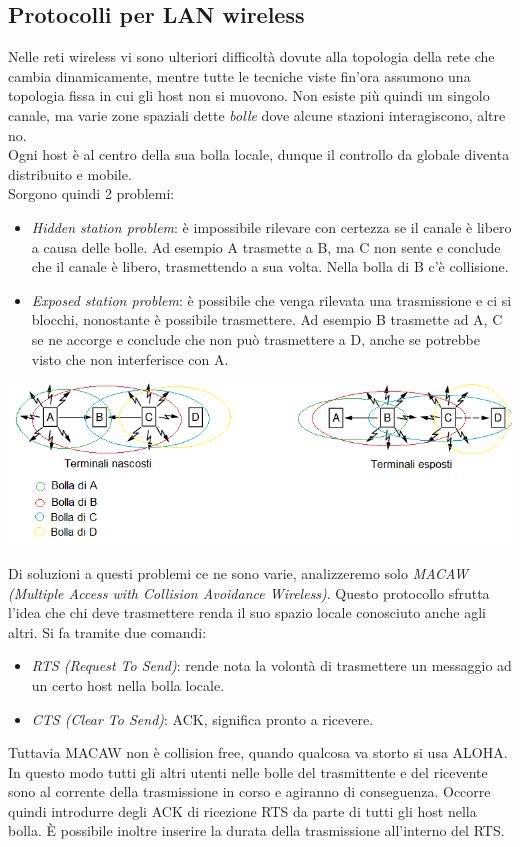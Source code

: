 \documentclass[10pt,a4paper,twoside]{article}
\begin{document}
\subsection{Protocolli per LAN wireless}
Nelle reti wireless vi sono ulteriori difficoltà dovute alla topologia della rete che cambia dinamicamente, mentre tutte le tecniche viste fin'ora assumono una topologia fissa in cui gli host non si muovono. Non esiste più quindi un singolo canale, ma varie zone spaziali dette \textit{bolle} dove alcune stazioni interagiscono, altre no.\\
Ogni host è al centro della sua bolla locale, dunque il controllo da globale diventa distribuito e mobile.\\
Sorgono quindi 2 problemi:
\begin{itemize}
\item \textit{Hidden station problem}: è impossibile rilevare con certezza se il canale è libero a causa delle bolle. Ad esempio A trasmette a B, ma C non sente e conclude che il canale è libero, trasmettendo a sua volta. Nella bolla di B c'è collisione.
\item \textit{Exposed station problem}: è possibile che venga rilevata una trasmissione e ci si blocchi, nonostante è possibile trasmettere. Ad esempio B trasmette ad A, C se ne accorge e conclude che non può trasmettere a D, anche se potrebbe visto che non interferisce con A.
\end{itemize}
\begin{center}
\includegraphics[]{images/problemi_wireless.png}
\end{center}
Di soluzioni a questi problemi ce ne sono varie, analizzeremo solo \textit{MACAW (Multiple Access with Collision Avoidance Wireless)}.
Questo protocollo sfrutta l'idea che chi deve trasmettere renda il suo spazio locale conosciuto anche agli altri. Si fa tramite due comandi:
\begin{itemize}
\item \textit{RTS (Request To Send)}: rende nota la volontà di trasmettere un messaggio ad un certo host nella bolla locale.
\item \textit{CTS (Clear To Send)}: ACK, significa pronto a ricevere.
\end{itemize}
Tuttavia MACAW non è collision free, quando qualcosa va storto si usa ALOHA. In questo modo tutti gli altri utenti nelle bolle del trasmittente e del ricevente sono al corrente della trasmissione in corso e agiranno di conseguenza. Occorre quindi introdurre degli ACK di ricezione RTS da parte di tutti gli host nella bolla. È possibile inoltre inserire la durata della trasmissione all'interno del RTS.
\end{document}
